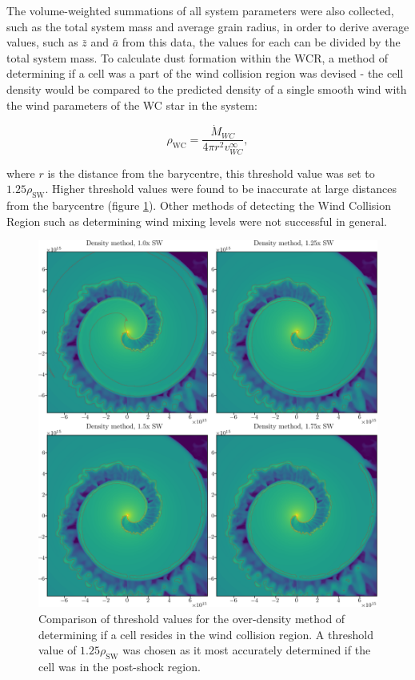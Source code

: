 The volume-weighted summations of all system parameters were also collected, such as the total system mass and average grain radius, in order to derive average values, such as $\bar{z}$ and $\bar{a}$ from this data, the values for each can be divided by the total system mass.
To calculate dust formation within the WCR, a method of determining if a cell was a part of the wind collision region was devised - the cell density would be compared to the predicted density of a single smooth wind with the wind parameters of the WC star in the system:

\begin{equation}
  \rho_\text{WC} = \frac{\dot{M}_{WC}}{4 \pi r^2 v^\infty_{WC}},
\end{equation}

\noindent
where $r$ is the distance from the barycentre, this threshold value was set to $1.25\rho_\text{SW}$.
Higher threshold values were found to be inaccurate at large distances from the barycentre (figure \ref{fig:overdensity-threshold}).
Other methods of detecting the Wind Collision Region such as determining wind mixing levels were not successful in general.

\begin{figure}
  \centering
  \includegraphics[width=5in]{assets/overdensity-method.png}
  \caption[Comparison of threshold values for over-density method]{Comparison of threshold values for the over-density method of determining if a cell resides in the wind collision region.
  A threshold value of $1.25\rho_\text{SW}$ was chosen as it most accurately determined if the cell was in the post-shock region.}
  \label{fig:overdensity-threshold}
\end{figure}

